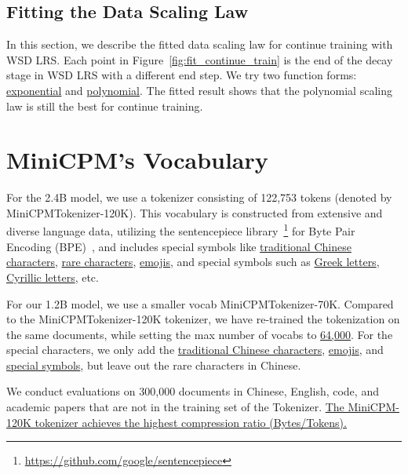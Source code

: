 \subsection{Fitting the Data Scaling Law}
\label{app:fittingdatascaling}
In this section, we describe the fitted data scaling law for continue training with WSD LRS. 
Each point in Figure~\ref{fig:fit_continue_train} is the end of the decay stage in WSD LRS with a different end step. We try two function forms: \uline{exponential} and \uline{polynomial}. The fitted result shows that the polynomial scaling law is still the best for continue training.

\section{MiniCPM's Vocabulary}
\label{app:tokenizer}

For the 2.4B model, we use a tokenizer consisting of 122,753 tokens (denoted by MiniCPMTokenizer-120K). This vocabulary is constructed from extensive and diverse language data, utilizing the sentencepiece library~\footnote{\url{https://github.com/google/sentencepiece}} for Byte Pair Encoding (BPE)~\citep{sennrich-etal-2016-neural}, and includes special symbols like \uline{traditional Chinese characters}, \uline{rare characters}, \uline{emojis}, and special symbols such as \uline{Greek letters}, \uline{Cyrillic letters}, etc.

For our 1.2B model, we use a smaller vocab MiniCPMTokenizer-70K. Compared to the MiniCPMTokenizer-120K tokenizer, we have re-trained the tokenization on the same documents, while setting the max number of vocabs to \uline{64,000}. For the special characters, we only add the \uline{traditional Chinese characters}, \uline{emojis}, and \uline{special symbols}, but leave out the rare characters in Chinese. 

We conduct evaluations on 300,000 documents in Chinese, English, code, and academic papers that are not in the training set of the Tokenizer. \uline{The MiniCPM-120K tokenizer achieves the highest compression ratio (Bytes/Tokens).}

